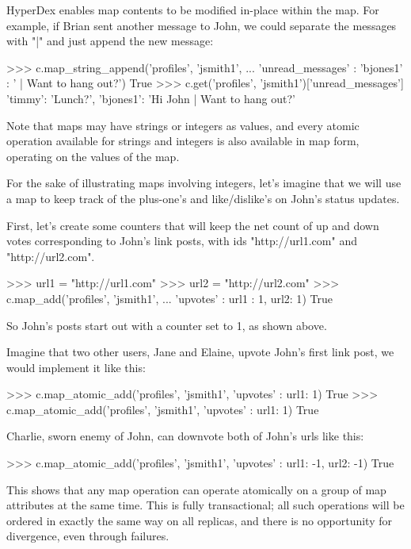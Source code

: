 HyperDex enables map contents to be modified in-place within the map.  For
example, if Brian sent another message to John, we could separate the messages
with "|" and just append the new message:

\begin{pythoncode}
>>> c.map_string_append('profiles', 'jsmith1',
...                      {'unread_messages' : {'bjones1' : ' | Want to hang out?'}})
True
>>> c.get('profiles', 'jsmith1')['unread_messages']
{'timmy': 'Lunch?', 'bjones1': 'Hi John | Want to hang out?'}
\end{pythoncode}

Note that maps may have strings or integers as values, and every atomic
operation available for strings and integers is also available in map form,
operating on the values of the map.

For the sake of illustrating maps involving integers, let's imagine that we will
use a map to keep track of the plus-one's and like/dislike's on John's status
updates. 

First, let's create some counters that will keep the net count of up and down
votes corresponding to John's link posts, with ids "http://url1.com" and
"http://url2.com". 

\begin{pythoncode}
>>> url1 = "http://url1.com"
>>> url2 = "http://url2.com"
>>> c.map_add('profiles', 'jsmith1',
...           {'upvotes' : {url1 : 1, url2: 1}})
True
\end{pythoncode}

So John's posts start out with a counter set to 1, as shown above. 

Imagine that two other users, Jane and Elaine, upvote John's first link post, we
would implement it like this:

\begin{pythoncode}
>>> c.map_atomic_add('profiles', 'jsmith1', {'upvotes' : {url1: 1}})
True
>>> c.map_atomic_add('profiles', 'jsmith1', {'upvotes' : {url1: 1}})
True
\end{pythoncode}

Charlie, sworn enemy of John, can downvote both of John's urls like this:

\begin{pythoncode}
>>> c.map_atomic_add('profiles', 'jsmith1', {'upvotes' : {url1: -1, url2: -1}})
True
\end{pythoncode}

This shows that any map operation can operate atomically on a group of map
attributes at the same time. This is fully transactional; all such operations
will be ordered in exactly the same way on all replicas, and there is no
opportunity for divergence, even through failures.

